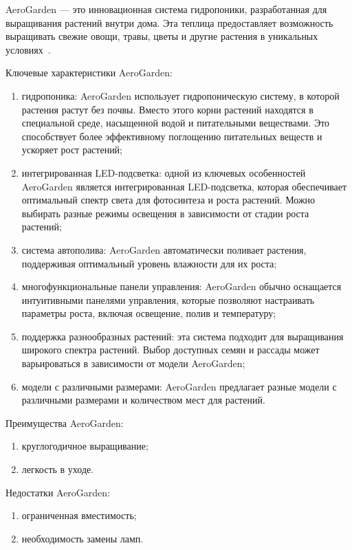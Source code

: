 AeroGarden --- это инновационная система гидропоники, разработанная для выращивания растений внутри дома. Эта теплица предоставляет возможность  выращивать свежие овощи, травы, цветы и другие растения в уникальных условиях~\cite{AeroGarden}.

Ключевые характеристики AeroGarden:

\begin{enumerate}
    \item гидропоника: AeroGarden использует гидропоническую систему, в которой растения растут без почвы. Вместо этого корни растений находятся в специальной среде, насыщенной водой и питательными веществами. Это способствует более эффективному поглощению питательных веществ и ускоряет рост растений;
    \item интегрированная LED-подсветка: одной из ключевых особенностей AeroGarden является интегрированная LED-подсветка, которая обеспечивает оптимальный спектр света для фотосинтеза и роста растений. Можно выбирать разные режимы освещения в зависимости от стадии роста растений;
    \item система автополива: AeroGarden автоматически поливает растения, поддерживая оптимальный уровень влажности для их роста;
    \item многофункциональные панели управления: AeroGarden обычно оснащается интуитивными панелями управления, которые позволяют настраивать параметры роста, включая освещение, полив и температуру;
    \item поддержка разнообразных растений: эта система подходит для выращивания широкого спектра растений. Выбор доступных семян и рассады может варьироваться в зависимости от модели AeroGarden;
    \item модели с различными размерами: AeroGarden предлагает разные модели с различными размерами и количеством мест для растений.
\end{enumerate}

Преимущества AeroGarden:

\begin{enumerate}
    \item круглогодичное выращивание;
    \item легкость в уходе.
\end{enumerate}

Недостатки AeroGarden:

\begin{enumerate}
    \item ограниченная вместимость;
    \item необходимость замены ламп.
\end{enumerate}


